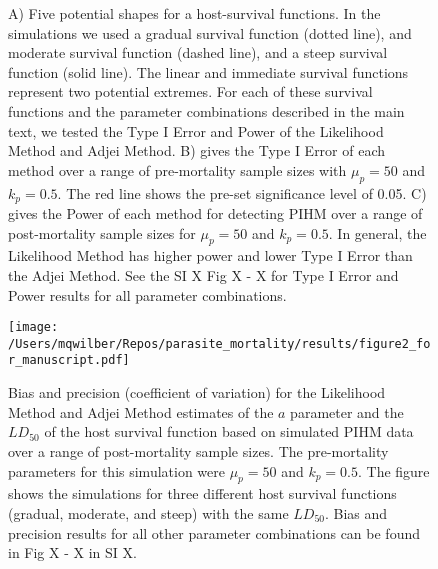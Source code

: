 \documentclass[12pt, a4paper]{article}
\begin{document}
\begin{figure}


\caption{A) Five potential shapes for a host-survival functions. In the simulations we used a gradual survival function (dotted line), and moderate survival function (dashed line), and a steep survival function (solid line). The linear and immediate survival functions represent two potential extremes. For each of these survival functions and the parameter combinations described in the main text, we tested the Type I Error and Power of the Likelihood Method and Adjei Method. B) gives the Type I Error of each method over a range of pre-mortality sample sizes with $\mu_p = 50$ and $k_p = 0.5$. The red line shows the pre-set significance level of 0.05. C) gives the Power of each method for detecting PIHM over a range of post-mortality sample sizes for $\mu_p = 50$ and $k_p = 0.5$.  In general, the Likelihood Method has higher power and lower Type I Error than the Adjei Method.  See the SI X Fig X - X for Type I Error and Power results for all parameter combinations.}

\end{figure}

\begin{figure}
    \texttt{[image: /Users/mqwilber/Repos/parasite\_mortality/results/figure2\_for\_manuscript.pdf]}

    \caption{Bias and precision (coefficient of variation) for the Likelihood Method and Adjei Method estimates of the $a$ parameter and the $LD_{50}$ of the host survival function based on simulated PIHM data over a range of post-mortality sample sizes. The pre-mortality parameters for this simulation were $\mu_p = 50$ and $k_p = 0.5$.  The figure shows the simulations for three different host survival functions (gradual, moderate, and steep) with the same $LD_{50}$.  Bias and precision results for all other parameter combinations can be found in Fig X - X in SI X.}

    \label{fig:question2}
\end{figure}
\end{document}
